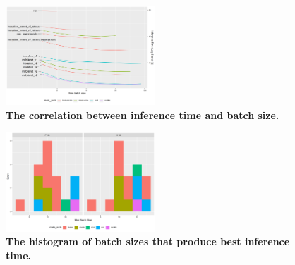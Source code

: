 \documentclass[conference]{IEEEtran}
\begin{document}
\begin{figure}[htpb]
	  \centering
	  \includegraphics[width=0.5\textwidth]{RunningVSBatch}
	  \caption{\textbf{The correlation between inference time and batch size.}}
	  \label{fig:running-batch}
\end{figure}

\begin{figure}[htpb]
	  \centering
	  \includegraphics[width=0.5\textwidth]{BestBatch-DiffArch}
	  \caption{\textbf{The histogram of batch sizes that produce best inference time.}}
	  \label{fig:bestbatch-diffarch}
\end{figure}

% 
% 
% 
% 
% 
% 
\end{document}
